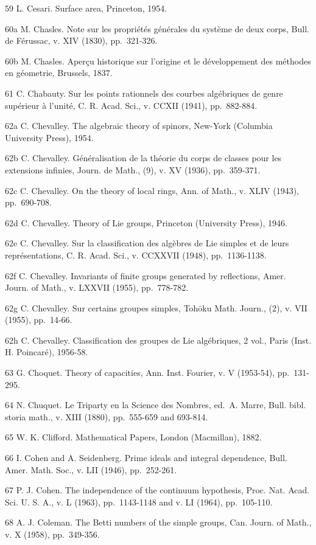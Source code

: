 59 L. Cesari. Surface area, Princeton, 1954.

60a M. Chasles. Note sur les propriétés générales du système de deux corps, Bull. de Férussac, v. XIV (1830), pp.~321-326.

60b M. Chasles. Aperçu historique sur l'origine et le développement des méthodes en géometrie, Brussels, 1837.

61 C. Chabauty. Sur les points rationnels des courbes algébriques de genre supérieur à l'unité, C. R. Acad. Sci., v. CCXII (1941), pp.~882-884.

62a C. Chevalley. The algebraic theory of spinors, New-York (Columbia University Press), 1954.

62b C. Chevalley. Généralisation de la théorie du corps de classes pour les extensions infinies, Journ. de Math., (9), v. XV (1936), pp.~359-371.

62c C. Chevalley. On the theory of local rings, Ann. of Math., v. XLIV (1943), pp.~690-708.

62d C. Chevalley. Theory of Lie groups, Princeton (University Press), 1946.

62e C. Chevalley. Sur la classification des algèbres de Lie simples et de leurs représentations, C. R. Acad. Sci., v. CCXXVII (1948), pp.~1136-1138.

62f C. Chevalley. Invariants of finite groups generated by reflections, Amer. Journ. of Math., v. LXXVII (1955), pp.~778-782.

62g C. Chevalley. Sur certains groupes simples, Tohōku Math. Journ., (2), v. VII (1955), pp.~14-66.

62h C. Chevalley. Classification des groupes de Lie algébriques, 2 vol., Paris (Inst. H. Poincaré), 1956-58.

63 G. Choquet. Theory of capacities, Ann. Inst. Fourier, v. V (1953-54), pp.~131-295.

64 N. Chuquet. Le Triparty en la Science des Nombres, ed.~A. Marre, Bull. bibl. storia math., v. XIII (1880), pp.~555-659 and 693-814.

65 W. K. Clifford. Mathematical Papers, London (Macmillan), 1882.

66 I. Cohen and A. Seidenberg. Prime ideals and integral dependence, Bull. Amer. Math. Soc., v. LII (1946), pp.~252-261.

67 P. J. Cohen. The independence of the continuum hypothesis, Proc. Nat. Acad. Sci. U. S. A., v. L (1963), pp.~1143-1148 and v. LI (1964), pp.~105-110.

68 A. J. Coleman. The Betti numbers of the simple groups, Can. Journ. of Math., v. X (1958), pp.~349-356.

